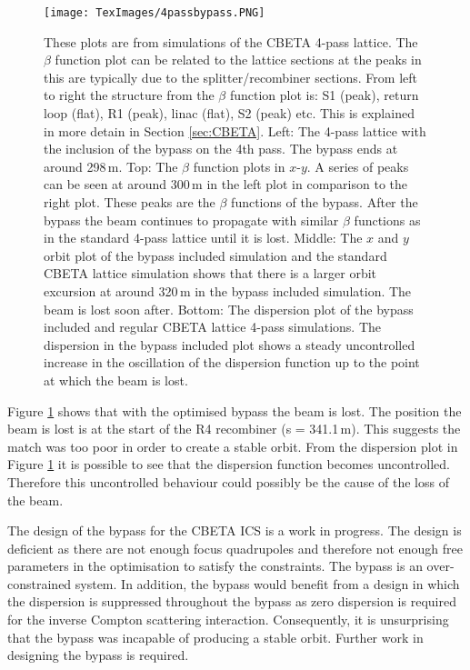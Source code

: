 \documentclass[11pt]{article}
\begin{document}
\begin{figure}[H]
\centering
\texttt{[image: TexImages/4passbypass.PNG]}
\caption{\label{fig:4passbypass} These plots are from simulations of the CBETA 4-pass lattice. The $\beta$ function plot can be related to the lattice sections at the peaks in this are typically due to the splitter/recombiner sections. From left to right the structure from the $\beta$ function plot is: S1 (peak), return loop (flat), R1 (peak), linac (flat), S2 (peak) etc. This is explained in more detain in Section \ref{sec:CBETA}. Left: The 4-pass lattice with the inclusion of the bypass on the 4th pass. The bypass ends at around 298\,m. Top: The $\beta$ function plots in $x$-$y$. A series of peaks can be seen at around 300\,m in the left plot in comparison to the right plot. These peaks are the $\beta$ functions of the bypass. After the bypass the beam continues to propagate with similar $\beta$ functions as in the standard 4-pass lattice until it is lost. Middle: The $x$ and $y$ orbit plot of the bypass included simulation and the standard CBETA lattice simulation shows that there is a larger orbit excursion at around 320\,m in the bypass included simulation. The beam is lost soon after. Bottom: The dispersion plot of the bypass included and regular CBETA lattice 4-pass simulations. The dispersion in the bypass included plot shows a steady uncontrolled increase in the oscillation of the dispersion function up to the point at which the beam is lost.}
\end{figure}

Figure \ref{fig:4passbypass} shows that with the optimised bypass the beam is lost. The position the beam is lost is at the start of the R4 recombiner (s = 341.1\,m). This suggests the match was too poor in order to create a stable orbit. From the dispersion plot in Figure \ref{fig:4passbypass} it is possible to see that the dispersion function becomes uncontrolled. Therefore this uncontrolled behaviour could possibly be the cause of the loss of the beam. 

The design of the bypass for the CBETA ICS is a work in progress. The design is deficient as there are not enough focus quadrupoles and therefore not enough free parameters in the optimisation to satisfy the constraints. The bypass is an over-constrained system. In addition, the bypass would benefit from a design in which the dispersion is suppressed throughout the bypass as zero dispersion is required for the inverse Compton scattering interaction. Consequently, it is unsurprising that the bypass was incapable of producing a stable orbit. Further work in designing the bypass is required.     
\end{document}
